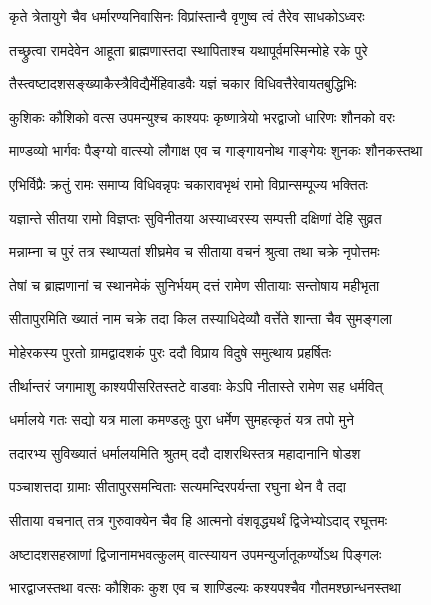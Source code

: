 \twolineshloka
{कृते त्रेतायुगे चैव धर्मारण्यनिवासिनः}
{विप्रांस्तान्वै वृणुष्व त्वं तैरेव साधकोऽध्वरः}%

\twolineshloka
{तच्छ्रुत्वा रामदेवेन आहूता ब्राह्मणास्तदा}
{स्थापिताश्च यथापूर्वमस्मिन्मोहे रके पुरे}%

\twolineshloka
{तैस्त्वष्टादशसङ्ख्याकैस्त्रैविद्यैर्मेहिवाडवैः}
{यज्ञं चकार विधिवत्तैरेवायतबुद्धिभिः}%

\twolineshloka
{कुशिकः कौशिको वत्स उपमन्युश्च काश्यपः}
{कृष्णात्रेयो भरद्वाजो धारिणः शौनको वरः}%

\twolineshloka
{माण्डव्यो भार्गवः पैङ्ग्यो वात्स्यो लौगाक्ष एव च}
{गाङ्गायनोथ गाङ्गेयः शुनकः शौनकस्तथा}%


\twolineshloka
{एभिर्विप्रैः क्रतुं रामः समाप्य विधिवन्नृपः}
{चकारावभृथं रामो विप्रान्सम्पूज्य भक्तितः}%

\twolineshloka
{यज्ञान्ते सीतया रामो विज्ञप्तः सुविनीतया}
{अस्याध्वरस्य सम्पत्ती दक्षिणां देहि सुव्रत}%

\twolineshloka
{मन्नाम्ना च पुरं तत्र स्थाप्यतां शीघ्रमेव च}
{सीताया वचनं श्रुत्वा तथा चक्रे नृपोत्तमः}%

\twolineshloka
{तेषां च ब्राह्मणानां च स्थानमेकं सुनिर्भयम्}
{दत्तं रामेण सीतायाः सन्तोषाय महीभृता}%

\twolineshloka
{सीतापुरमिति ख्यातं नाम चक्रे तदा किल}
{तस्याधिदेव्यौ वर्त्तेते शान्ता चैव सुमङ्गला}%

\twolineshloka
{मोहेरकस्य पुरतो ग्रामद्वादशकं पुरः}
{ददौ विप्राय विदुषे समुत्थाय प्रहर्षितः}%

\twolineshloka
{तीर्थान्तरं जगामाशु काश्यपीसरितस्तटे}
{वाडवाः केऽपि नीतास्ते रामेण सह धर्मवित्}%

\twolineshloka
{धर्मालये गतः सद्यो यत्र माला कमण्डलुः}
{पुरा धर्मेण सुमहत्कृतं यत्र तपो मुने}%

\twolineshloka
{तदारभ्य सुविख्यातं धर्मालयमिति श्रुतम्}
{ददौ दाशरथिस्तत्र महादानानि षोडश}%

\twolineshloka
{पञ्चाशत्तदा ग्रामाः सीतापुरसमन्विताः}
{सत्यमन्दिरपर्यन्ता रघुना थेन वै तदा}%

\twolineshloka
{सीताया वचनात् तत्र गुरुवाक्येन चैव हि}
{आत्मनो वंशवृद्ध्यर्थं द्विजेभ्योऽदाद् रघूत्तमः}%

\twolineshloka
{अष्टादशसहस्राणां द्विजानामभवत्कुलम्}
{वात्स्यायन उपमन्युर्जातूकर्ण्योऽथ पिङ्गलः}%

\twolineshloka
{भारद्वाजस्तथा वत्सः कौशिकः कुश एव च}
{शाण्डिल्यः कश्यपश्चैव गौतमश्छान्धनस्तथा}%

